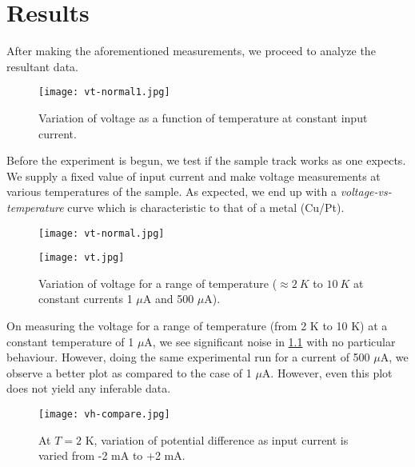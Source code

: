 \chapter{Results}


\label{chapter5}

After making the aforementioned measurements, we proceed to analyze the resultant data.

\begin{figure}[h!]
    \centering
    \texttt{[image: vt-normal1.jpg]}
    \caption{Variation of voltage as a function of temperature at constant input current.}
\end{figure}

Before the experiment is begun, we test if the sample track works as one expects.
We supply a fixed value of input current and make voltage measurements at various temperatures of the sample.
As expected, we end up with a \textit{voltage-vs-temperature} curve which is characteristic to that of a metal (Cu/Pt).

\begin{figure}[h!]
    \centering
    \texttt{[image: vt-normal.jpg]}
    \caption{}
\end{figure}

\clearpage

\begin{figure}[h!]
    \centering
    \texttt{[image: vt.jpg]}
    \caption{Variation of voltage for a range of temperature (\( \approx 2 \: K \) to \( 10 \: K \) at constant currents 1 \( \mu \)A and 500 \( \mu \)A).}
    \label{fig:vt}
\end{figure}

On measuring the voltage for a range of temperature (from 2 K to 10 K) at a constant temperature of 1 \( \mu \)A, we see significant noise in \cref{fig:vt} with no particular behaviour. However, doing the same experimental run for a current of 500 \( \mu \)A, we observe a better plot as compared to the case of 1 \( \mu \)A. However, even this plot does not yield any inferable data.

\clearpage

\begin{figure}[h!]
    \texttt{[image: vh-compare.jpg]}
    \caption{At \( T = 2 \) K, variation of potential difference as input current is varied from -2 mA to +2 mA.}
    \label{fig:vh-compare}
\end{figure}

